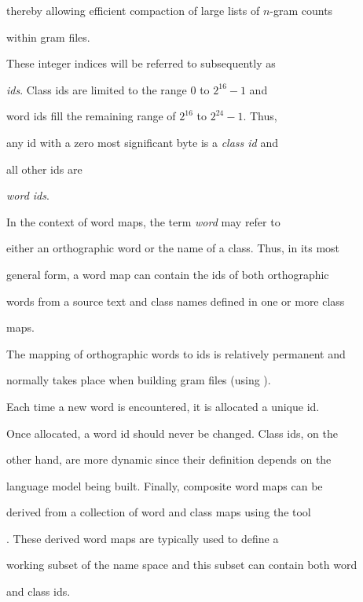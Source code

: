 thereby allowing efficient compaction of large lists of $n$-gram counts


within gram files.





These integer indices will be referred to subsequently as


\textit{ids}.  Class ids are limited to the range 0 to $2^{16}-1$ and


word ids fill the remaining range of $2^{16}$ to $2^{24} - 1$.  Thus,


any id with a zero most significant byte is a \textit{class id} and


all other ids are


\textit{word ids}.





In the context of word maps, the term \textit{word} may refer to


either an orthographic word or the name of a class.  Thus, in its most


general form, a word map can contain the ids of both orthographic


words from a source text and class names defined in one or more class


maps.





The mapping of orthographic words to ids is relatively permanent and


normally takes place when building gram files (using ).


Each time a new word is encountered, it is allocated a unique id.


Once allocated, a word id should never be changed. Class ids, on the


other hand, are more dynamic since their definition depends on the


language model being built.  Finally, composite word maps can be


derived from a collection of word and class maps using the tool


.  These derived word maps are typically used to define a


working subset of the name space and this subset can contain both word


and class ids.





